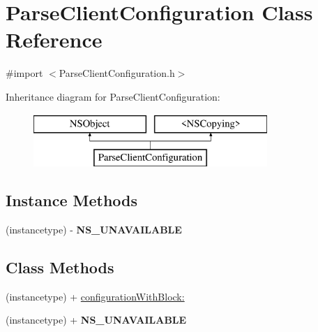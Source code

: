 \hypertarget{interface_parse_client_configuration}{}\section{Parse\+Client\+Configuration Class Reference}
\label{interface_parse_client_configuration}


{\ttfamily \#import $<$Parse\+Client\+Configuration.\+h$>$}

Inheritance diagram for Parse\+Client\+Configuration\+:\begin{figure}[H]
\begin{center}
\leavevmode
\includegraphics[height=2.000000cm]{interface_parse_client_configuration}
\end{center}
\end{figure}
\subsection*{Instance Methods}
\begin{DoxyCompactItemize}
\item 
\hypertarget{interface_parse_client_configuration_aaa974a25fe0d7376b377abb615a847f0}{}(instancetype) -\/ {\bfseries N\+S\+\_\+\+U\+N\+A\+V\+A\+I\+L\+A\+B\+L\+E}\label{interface_parse_client_configuration_aaa974a25fe0d7376b377abb615a847f0}

\end{DoxyCompactItemize}
\subsection*{Class Methods}
\begin{DoxyCompactItemize}
\item 
(instancetype) + \hyperlink{interface_parse_client_configuration_a855bbb5b20674872eecb34834f8ca59b}{configuration\+With\+Block\+:}
\begin{DoxyCompactList}\small\item\em 

 \end{DoxyCompactList}\item 
\hypertarget{interface_parse_client_configuration_aaa974a25fe0d7376b377abb615a847f0}{}(instancetype) + {\bfseries N\+S\+\_\+\+U\+N\+A\+V\+A\+I\+L\+A\+B\+L\+E}\label{interface_parse_client_configuration_aaa974a25fe0d7376b377abb615a847f0}

\end{DoxyCompactItemize}
